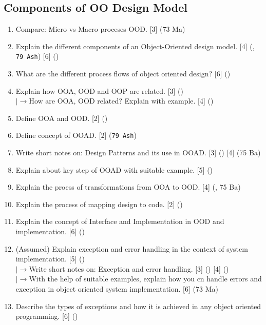 \documentclass[12pt]{article}
\newcommand{\lb}{\\$\left|\rightarrow\right.$}
\begin{document}
  \subsection{Components of OO Design Model}
    \begin{enumerate}
      \item Compare: Micro vs Macro proceses OOD. \hfill [3] (73 Ma)

      \item Explain the different components of an Object-Oriented design model. \hfill [4] (, \texttt{79 Ash}) [6] ()
      
      \item What are the different process flows of object oriented design? \hfill [6] ()

      \item Explain how OOA, OOD and OOP are related. \hfill [3] ()
        \lb How are OOA, OOD related? Explain with example. \hfill [4] ()

      \item Define OOA and OOD. \hfill [2] ()

      \item Define concept of OOAD. \hfill [2] (\texttt{79 Ash})

      \item Write short notes on: Design Patterns and its use in OOAD. \hfill [3] () [4] (75 Ba)

      \item Explain about key step of OOAD with suitable example. \hfill [5] ()

      \item Explain the proess of transformations from OOA to OOD. \hfill [4] (, 75 Ba)

      \item Explain the process of mapping design to code. \hfill [2] ()

      \item Explain the concept of Interface and Implementation in OOD and implementation. \hfill [6] ()

      \item (Assumed) Explain exception and error handling in the context of system implementation. \hfill [5] ()
        \lb Write short notes on: Exception and error handling. \hfill [3] () [4] ()
        \lb With the help of suitable examples, explain how you cn handle errors and exception in object oriented system implementation. \hfill [6] (73 Ma)

      \item Describe the types of exceptions and how it is achieved in any object oriented programming. \hfill [6] ()
    \end{enumerate}
\end{document}
